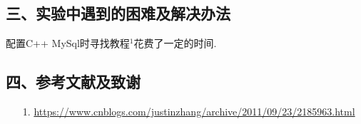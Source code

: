 \documentclass[a4paper,UTF8]{article}
\theoremstyle{definition}
\begin{document}
\begin{CJK}{UTF8}{gkai}
\begin{flushleft}
\begin{CJK*}{UTF8}{heiti}
\section*{三、实验中遇到的困难及解决办法}
\end{CJK*}
\end{flushleft}
\par 配置C++ MySql时寻找教程$^{1}$花费了一定的时间.\\
\begin{flushleft}
\begin{CJK*}{UTF8}{heiti}
\section*{四、参考文献及致谢}
\end{CJK*}
\end{flushleft}
\begin{enumerate}
\item[1.] \url{https://www.cnblogs.com/justinzhang/archive/2011/09/23/2185963.html}
\end{enumerate}
\end{CJK}
\end{document}
